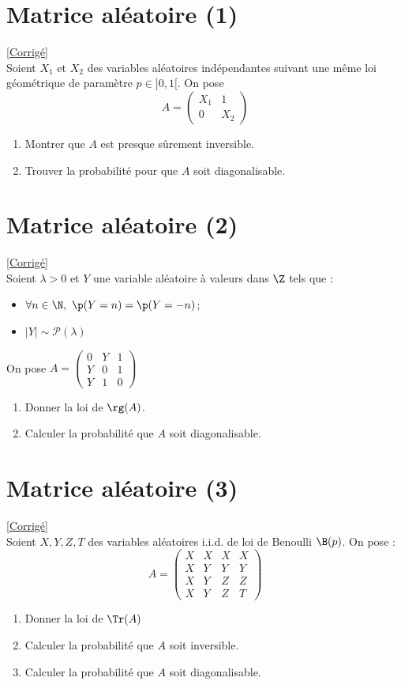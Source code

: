 \documentclass[8pt]{book}
\begin{document}
\section{Matrice aléatoire (1) }
\label{Matrice aléatoire 1}
\textcolor{blue}{\hyperref[Matrice aléatoire 1 corrigé]{[Corrigé]}}\\
Soient $X_1$ et $X_2$ des variables aléatoires indépendantes suivant une même loi géométrique de paramètre $p\in]0,1[$. On pose $$A=\begin{pmatrix}
	X_1 &1\\
	0 & X_2
\end{pmatrix}$$
\begin{enumerate}
	\item Montrer que $A$ est presque sûrement inversible.
	\item Trouver la probabilité pour que $A$ soit diagonalisable.
\end{enumerate}

\section{Matrice aléatoire (2)}
\label{Matrice aléatoire 2}
\textcolor{blue}{\hyperref[Matrice aléatoire 2 corrigé]{[Corrigé]}}\\
Soient $\lambda>0$ et $Y$ une variable aléatoire à valeurs dans $\Z$ tels que :
\begin{itemize}
	\item $\forall n\in \N,\ \p(Y=n)=\p(Y=-n)$;
	\item $|Y|\sim\mathcal P(\lambda)$
\end{itemize}
On pose $A=\begin{pmatrix}
	0&Y&1\\
	Y&0&1\\
	Y&1&0
\end{pmatrix}$
\begin{enumerate}
	\item Donner la loi de $\rg(A)$.
	\item Calculer la probabilité que $A$ soit diagonalisable.
\end{enumerate}

\section{Matrice aléatoire (3)}
\label{Matrice aléatoire 3}
\textcolor{blue}{\hyperref[Matrice aléatoire 3 corrigé]{[Corrigé]}}\\
Soient $X,Y,Z,T$ des variables aléatoires i.i.d. de loi de Benoulli $\B(p)$. On pose :
$$A=\begin{pmatrix}
	X&X&X&X\\
	X&Y&Y&Y\\
	X&Y&Z&Z\\
	X&Y&Z&T
\end{pmatrix}$$
\begin{enumerate}
	\item Donner la loi de $\Tr(A)$
	\item Calculer la probabilité que $A$ soit inversible.
	\item Calculer la probabilité que $A$ soit diagonalisable.
\end{enumerate}
\end{document}
